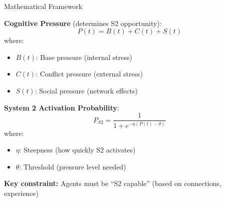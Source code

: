 \documentclass[aspectratio=169]{beamer}
\begin{document}
\begin{frame}{Mathematical Framework}

\textbf{Cognitive Pressure} (determines S2 opportunity):
\begin{equation*}
P(t) = B(t) + C(t) + S(t)
\end{equation*}
where:
\begin{itemize}
    \item $B(t)$: Base pressure (internal stress)
    \item $C(t)$: Conflict pressure (external stress) 
    \item $S(t)$: Social pressure (network effects)
\end{itemize}

\vspace{0.5em}

\textbf{System 2 Activation Probability}:
\begin{equation*}
P_{S2} = \frac{1}{1 + e^{-\eta(P(t) - \theta)}}
\end{equation*}
where:
\begin{itemize}
    \item $\eta$: Steepness (how quickly S2 activates)
    \item $\theta$: Threshold (pressure level needed)
\end{itemize}

\vspace{0.5em}

\textbf{Key constraint:} Agents must be ``S2 capable'' (based on connections, experience)

\end{frame}
\end{document}
